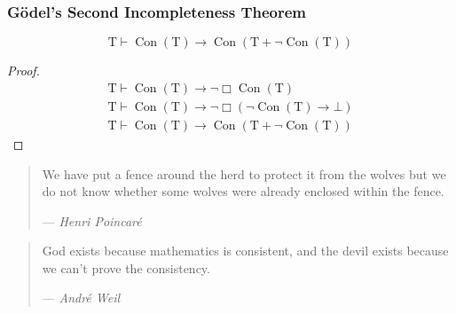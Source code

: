\documentclass[UTF8,11pt,colorlinks,compress,openany]{beamer}%
\begin{document}
\begin{frame}\frametitle{G\"odel's Second Incompleteness Theorem}
\setlength\abovedisplayskip{0pt}
\setlength\belowdisplayskip{0pt}
	\begin{block}{}
		\[\mathrm{T}\vdash\operatorname{Con}(\mathrm{T})\to\operatorname{Con}(\mathrm{T}+\neg\operatorname{Con}(\mathrm{T}))\]
	\end{block}
	\begin{proof}
		\begin{gather*}
		\mathrm{T}\vdash\operatorname{Con}(\mathrm{T})\to\neg\Box \operatorname{Con}(\mathrm{T})\\
		\mathrm{T}\vdash\operatorname{Con}(\mathrm{T})\to\neg\Box (\neg\operatorname{Con}(\mathrm{T})\to\bot)\\
		\mathrm{T}\vdash\operatorname{Con}(\mathrm{T})\to\operatorname{Con}(\mathrm{T}+\neg\operatorname{Con}(\mathrm{T}))
		\end{gather*}
	\end{proof}
\begin{quote}
We have put a fence around the herd to protect it from the wolves but we do not know whether some wolves were already enclosed within the fence.\par\hfill
--- \textsl{Henri Poincar\'e}
\end{quote}
\begin{quote}
	God exists because mathematics is consistent, and the devil exists because we can't prove the consistency. \par
		\hfill --- \textsl{Andr\'e Weil}
\end{quote}
\end{frame}
\end{document}
